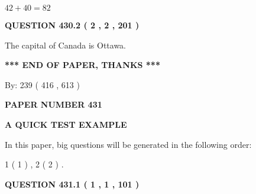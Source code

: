 \documentclass[12pt]{article}
\begin{document}
$ %
42 +  %
40=   %
82$
 
 
  
\vspace{0.2in}
  
{\textbf{\Large{QUESTION
430.2 
 ( 2 , 2 , 201 )
}}}
  
  
 
 
\noindent{}
 
 
The capital of Canada is Ottawa.
 
 
 
 
   
   
 \vspace{0.2in}
 
   
   
   
   
\vspace{1.0in} 
{\textbf{\large{ *** END OF PAPER, THANKS *** }}} 
   
   
\hspace{1.0in} By: 
 239 ( 416 ,  613 )
   
   
   
   
\newpage 
\setcounter{page}{ 
   431001 } 
   
   
   
   
 {\textbf{ \Large{ PAPER NUMBER  431  }}}
   
   
\vspace{0.2in}
   
   
   
   
   
   
 \vspace{0.2in}
{\LARGE {\textbf{ A QUICK TEST EXAMPLE}}}
   
   
   
\vspace{0.2in}
   
In this paper, big questions will be generated in the following order: 
   
   
   1 ( 1 )
 ,
   2 ( 2 )
 .
  
\vspace{0.2in}
  
{\textbf{\Large{QUESTION
431.1 
 ( 1 , 1 , 101 )
}}}
  
  
 
 
\noindent{}
\end{document}
